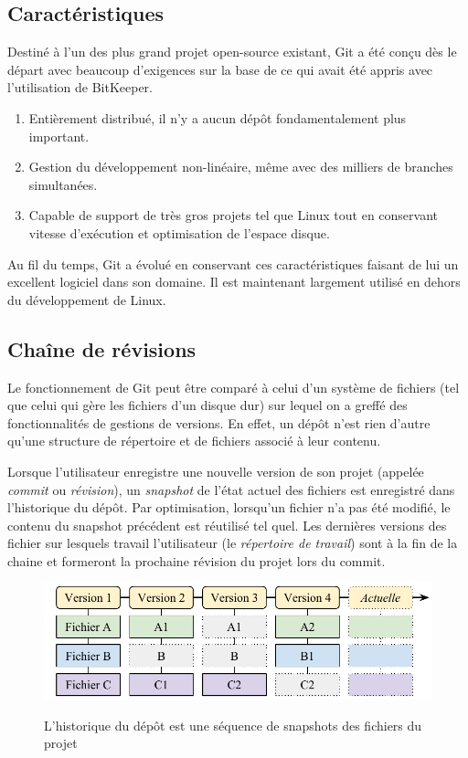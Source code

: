 \documentclass[11pt,a4paper]{article}
\begin{document}
\subsection{Caractéristiques}

Destiné à l'un des plus grand projet open-source existant, Git a été conçu dès le départ avec beaucoup d'exigences sur la base de ce qui avait été appris avec l'utilisation de BitKeeper.

\begin{enumerate}
	\item {Entièrement distribué}, 
	il n'y a aucun dépôt fondamentalement plus important.
	
	\item {Gestion du développement non-linéaire},
	même avec des milliers de branches simultanées.
	
	\item {Capable de support de très gros projets}
	tel que Linux tout en conservant vitesse d'exécution et optimisation de l'espace disque.
\end{enumerate}

Au fil du temps, Git a évolué en conservant ces caractéristiques faisant de lui un excellent logiciel dans son domaine.
Il est maintenant largement utilisé en dehors du développement de Linux.

\subsection{Chaîne de révisions}

Le fonctionnement de Git peut être comparé à celui d'un système de fichiers (tel que celui qui gère les fichiers d'un disque dur) sur lequel on a greffé des fonctionnalités de gestions de versions.
En effet, un dépôt n'est rien d'autre qu'une structure de répertoire et de fichiers associé à leur contenu.

Lorsque l'utilisateur enregistre une nouvelle version de son projet (appelée \textit{commit} ou \textit{révision}), un \textit{snapshot} de l'état actuel des fichiers est enregistré dans l'historique du dépôt.
Par optimisation, lorsqu'un fichier n'a pas été modifié, le contenu du snapshot précédent est réutilisé tel quel. Les dernières versions des fichier sur lesquels travail l'utilisateur (le \textit{répertoire de travail}) sont à la fin de la chaine et formeront la prochaine révision du projet lors du commit.

\begin{figure}[ht]
\begin{center}
\includegraphics[width=12cm]{img_snapshots} \cite{progit}
\caption{L'historique du dépôt est une séquence de snapshots des fichiers du projet}
\end{center}
\end{figure}
\end{document}
